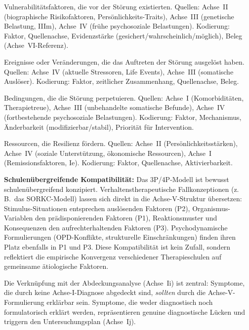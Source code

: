 \documentclass[11pt,a4paper]{article}
\begin{document}
\begin{description}[style=nextline, leftmargin=1.5cm, font=\bfseries]
\item[Pr\"adisponierende Faktoren (P1)] Vulnerabilit\"atsfaktoren, die vor der St\"orung existierten. Quellen: Achse~II (biographische Risikofaktoren, Pers\"onlichkeits-Traits), Achse~III (genetische Belastung, IIIm), Achse~IV (fr\"uhe psychosoziale Belastungen). Kodierung: Faktor, Quellenachse, Evidenzst\"arke (gesichert/wahrscheinlich/m\"oglich), Beleg (Achse~VI-Referenz).
\item[Ausl\"osende Faktoren (P2)] Ereignisse oder Ver\"anderungen, die das Auftreten der St\"orung ausgel\"ost haben. Quellen: Achse~IV (aktuelle Stressoren, Life Events), Achse~III (somatische Ausl\"oser). Kodierung: Faktor, zeitlicher Zusammenhang, Quellenachse, Beleg.
\item[Aufrechterhaltende Faktoren (P3)] Bedingungen, die die St\"orung perpetuieren. Quellen: Achse~I (Komorbidit\"aten, Therapietreue), Achse~III (unbehandelte somatische Befunde), Achse~IV (fortbestehende psychosoziale Belastungen). Kodierung: Faktor, Mechanismus, \"Anderbarkeit (modifizierbar/stabil), Priorit\"at f\"ur Intervention.
\item[Protektive Faktoren (P4)] Ressourcen, die Resilienz f\"ordern. Quellen: Achse~II (Pers\"onlichkeitsst\"arken), Achse~IV (soziale Unterst\"utzung, \"okonomische Ressourcen), Achse~I (Remissionsfaktoren, Ie). Kodierung: Faktor, Quellenachse, Aktivierbarkeit.
\end{description}

\textbf{Schulen\"ubergreifende Kompatibilit\"at:} Das 3P/4P-Modell ist bewusst schulen\"ubergreifend konzipiert. Verhaltenstherapeutische Fallkonzeptionen (z.\,B.\ das SORKC-Modell) lassen sich direkt in die Achse-V-Struktur \"ubersetzen: Stimulus-Situationen entsprechen ausl\"osenden Faktoren (P2), Organismus-Variablen den pr\"adisponierenden Faktoren (P1), Reaktionsmuster und Konsequenzen den aufrechterhaltenden Faktoren (P3). Psychodynamische Formulierungen (OPD-Konflikte, strukturelle Einschr\"ankungen) finden ihren Platz ebenfalls in P1 und P3. Diese Kompatibilit\"at ist kein Zufall, sondern reflektiert die empirische Konvergenz verschiedener Therapieschulen auf gemeinsame \"atiologische Faktoren.

Die Verkn\"upfung mit der Abdeckungsanalyse (Achse~Ii) ist zentral: Symptome, die durch keine Achse-I-Diagnose abgedeckt sind, \textit{sollten} durch die Achse-V-Formulierung erkl\"arbar sein. Symptome, die weder diagnostisch noch formulatorisch erkl\"art werden, repr\"asentieren genuine diagnostische L\"ucken und triggern den Untersuchungsplan (Achse~Ij).
\end{document}
